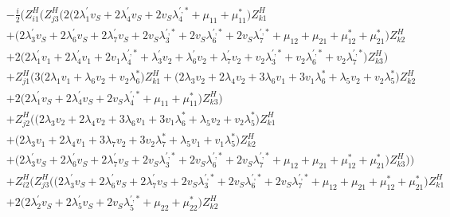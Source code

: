 \begin{align} 
 &-\frac{i}{2} \Big(Z_{{i 1}}^{H} \Big(Z_{{j 3}}^{H} \Big(2 \Big(2 \lambda^{\prime}_1 v_S  + 2 \lambda^{\prime}_4 v_S  + 2 v_S \lambda^{{\prime},*}_4  + \mu_{11} + \mu_{11}^*\Big)Z_{{k 1}}^{H} \nonumber \\ 
 &+\Big(2 \lambda^{\prime}_3 v_S  + 2 \lambda^{\prime}_6 v_S  + 2 \lambda^{\prime}_7 v_S  + 2 v_S \lambda^{{\prime},*}_3  + 2 v_S \lambda^{{\prime},*}_6  + 2 v_S \lambda^{{\prime},*}_7  + \mu_{12} + \mu_{21} + \mu_{12}^* + \mu_{21}^*\Big)Z_{{k 2}}^{H} \nonumber \\ 
 &+2 \Big(2 \lambda^{\prime}_1 v_1  + 2 \lambda^{\prime}_4 v_1  + 2 v_1 \lambda^{{\prime},*}_4  + \lambda^{\prime}_3 v_2  + \lambda^{\prime}_6 v_2  + \lambda^{\prime}_7 v_2  + v_2 \lambda^{{\prime},*}_3  + v_2 \lambda^{{\prime},*}_6  + v_2 \lambda^{{\prime},*}_7 \Big)Z_{{k 3}}^{H} \Big)\nonumber \\ 
 &+Z_{{j 1}}^{H} \Big(3 \Big(2 \lambda_1 v_1  + \lambda_6 v_2  + v_2 \lambda_6^* \Big)Z_{{k 1}}^{H} +\Big(2 \lambda_3 v_2  + 2 \lambda_4 v_2  + 3 \lambda_6 v_1  + 3 v_1 \lambda_6^*  + \lambda_5 v_2  + v_2 \lambda_5^* \Big)Z_{{k 2}}^{H} \nonumber \\ 
 &+2 \Big(2 \lambda^{\prime}_1 v_S  + 2 \lambda^{\prime}_4 v_S  + 2 v_S \lambda^{{\prime},*}_4  + \mu_{11} + \mu_{11}^*\Big)Z_{{k 3}}^{H} \Big)\nonumber \\ 
 &+Z_{{j 2}}^{H} \Big(\Big(2 \lambda_3 v_2  + 2 \lambda_4 v_2  + 3 \lambda_6 v_1  + 3 v_1 \lambda_6^*  + \lambda_5 v_2  + v_2 \lambda_5^* \Big)Z_{{k 1}}^{H} \nonumber \\ 
 &+\Big(2 \lambda_3 v_1  + 2 \lambda_4 v_1  + 3 \lambda_7 v_2  + 3 v_2 \lambda_7^*  + \lambda_5 v_1  + v_1 \lambda_5^* \Big)Z_{{k 2}}^{H} \nonumber \\ 
 &+\Big(2 \lambda^{\prime}_3 v_S  + 2 \lambda^{\prime}_6 v_S  + 2 \lambda^{\prime}_7 v_S  + 2 v_S \lambda^{{\prime},*}_3  + 2 v_S \lambda^{{\prime},*}_6  + 2 v_S \lambda^{{\prime},*}_7  + \mu_{12} + \mu_{21} + \mu_{12}^* + \mu_{21}^*\Big)Z_{{k 3}}^{H} \Big)\Big)\nonumber \\ 
 &+Z_{{i 2}}^{H} \Big(Z_{{j 3}}^{H} \Big(\Big(2 \lambda^{\prime}_3 v_S  + 2 \lambda^{\prime}_6 v_S  + 2 \lambda^{\prime}_7 v_S  + 2 v_S \lambda^{{\prime},*}_3  + 2 v_S \lambda^{{\prime},*}_6  + 2 v_S \lambda^{{\prime},*}_7  + \mu_{12} + \mu_{21} + \mu_{12}^* + \mu_{21}^*\Big)Z_{{k 1}}^{H} \nonumber \\ 
 &+2 \Big(2 \lambda^{\prime}_2 v_S  + 2 \lambda^{\prime}_5 v_S  + 2 v_S \lambda^{{\prime},*}_5  + \mu_{22} + \mu_{22}^*\Big)Z_{{k 2}}^{H} \nonumber \\ 

\end{align}
